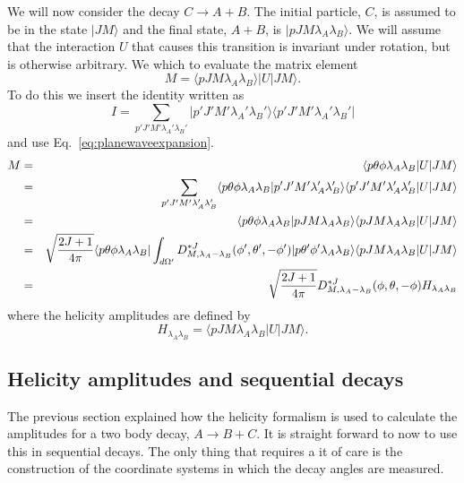 We will now consider the decay $C\rightarrow A+B$. The initial
particle, $C$, is assumed to be in the state $|J M\rangle$ and the 
final state, $A+B$, is $|pJM\lambda_A\lambda_B\rangle$. We will assume
that the interaction $U$ that causes this transition is invariant
under rotation, but is otherwise arbitrary. We which to evaluate
the matrix element 
\begin{equation}
M=\langle pJM\lambda_A\lambda_B\rangle | U | J M \rangle.
\end{equation}
To do this we insert the identity written as
\begin{equation}
I=\sum_{p'J'M'\lambda_A'\lambda_B'}
|p'J'M'\lambda_A'\lambda_B'\rangle\langle p'J'M'\lambda_A'\lambda_B'|
\end{equation}
and use Eq.~\ref{eq:planewaveexpansion}.
\begin{eqnarray}
M & = & \langle p\theta\phi \lambda_A \lambda_B | U | J M \rangle\nonumber \\
  & = & \sum_{p'J'M' \lambda_A' \lambda_B'}
        \langle p\theta\phi \lambda_A \lambda_B |
        p'J'M'\lambda_A'\lambda_B'\rangle\langle p'J'M'\lambda_A'\lambda_B'|
        U | J M \rangle \nonumber\\
  & = & \langle p\theta\phi \lambda_A \lambda_B |
        pJM\lambda_A\lambda_B\rangle\langle pJM\lambda_A\lambda_B|
        U | J M \rangle \nonumber\\
  & = & \sqrt{2J+1\over 4\pi}\langle p\theta\phi \lambda_A \lambda_B |
       \int_{d\Omega'}D^{*J}_{M,\lambda_A-\lambda_B}(\phi',\theta',-\phi')
       |p\theta'\phi'\lambda_A\lambda_B\rangle
       \langle pJM\lambda_A\lambda_B|U | J M \rangle\nonumber \\
  & = & \sqrt{2J+1\over 4\pi}D^{*J}_{M,\lambda_A-\lambda_B}(\phi,\theta,-\phi)
        H_{\lambda_A\lambda_B}
\label{eq:helicityformula}
\end{eqnarray}
where the helicity amplitudes are defined by 
\begin{equation}
H_{\lambda_A\lambda_B}=\langle pJM\lambda_A\lambda_B|U | J M \rangle. 
\end{equation}



\subsection{Helicity amplitudes and sequential decays}

The previous section explained how the helicity formalism 
is used to calculate the amplitudes for a two body decay, $A\rightarrow B+C$.
It is straight forward to now to use this in sequential decays.
The only thing that requires a it of care is the construction 
of the coordinate systems in which the decay angles are measured.


